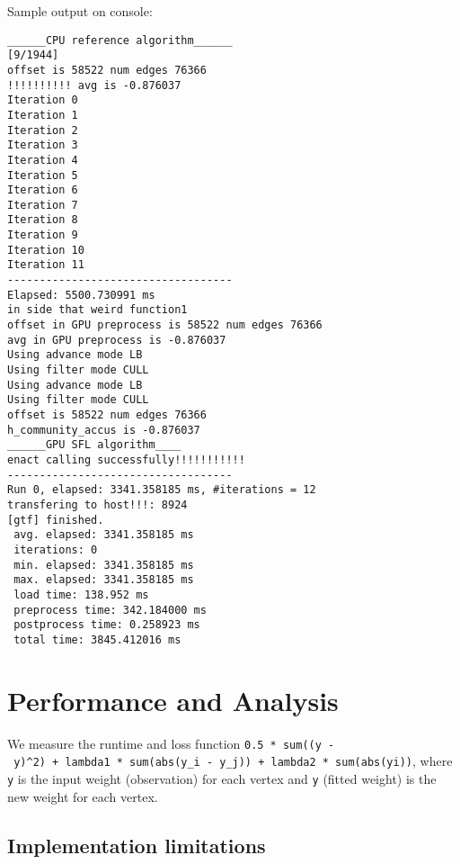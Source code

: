 \documentclass[10pt,oneside]{memoir}
\begin{document}
Sample output on console:

\begin{verbatim}
______CPU reference algorithm______                                                                                                                                  [9/1944]
offset is 58522 num edges 76366
!!!!!!!!!! avg is -0.876037
Iteration 0
Iteration 1
Iteration 2
Iteration 3
Iteration 4
Iteration 5
Iteration 6
Iteration 7
Iteration 8
Iteration 9
Iteration 10
Iteration 11
-----------------------------------
Elapsed: 5500.730991 ms
in side that weird function1
offset in GPU preprocess is 58522 num edges 76366
avg in GPU preprocess is -0.876037
Using advance mode LB
Using filter mode CULL
Using advance mode LB
Using filter mode CULL
offset is 58522 num edges 76366
h_community_accus is -0.876037
______GPU SFL algorithm____
enact calling successfully!!!!!!!!!!!
-----------------------------------
Run 0, elapsed: 3341.358185 ms, #iterations = 12
transfering to host!!!: 8924
[gtf] finished.
 avg. elapsed: 3341.358185 ms
 iterations: 0
 min. elapsed: 3341.358185 ms
 max. elapsed: 3341.358185 ms
 load time: 138.952 ms
 preprocess time: 342.184000 ms
 postprocess time: 0.258923 ms
 total time: 3845.412016 ms
\end{verbatim}

\hypertarget{performance-and-analysis-8}{%
\section{Performance and Analysis}\label{performance-and-analysis-8}}

We measure the runtime and loss function
\texttt{0.5\ *\ sum((y\textquotesingle{}\ -\ y)\^{}2)\ +\ lambda1\ *\ sum(abs(y\_i\textquotesingle{}\ -\ y\_j\textquotesingle{}))\ +\ lambda2\ *\ sum(abs(yi\textquotesingle{}))},
where \texttt{y} is the input weight (observation) for each vertex and
\texttt{y\textquotesingle{}} (fitted weight) is the new weight for each
vertex.

\hypertarget{implementation-limitations-8}{%
\subsection{Implementation
limitations}\label{implementation-limitations-8}}
\end{document}
